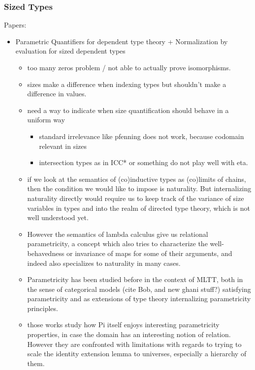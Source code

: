\documentclass{book}
\begin{document}
\subsubsection{Sized Types}
Papers:
\begin{itemize}
\item Parametric Quantifiers for dependent type theory + Normalization by evaluation for sized dependent types
    \begin{itemize}
    \item too many zeros problem / not able to actually prove isomorphisms.
    \item sizes make a difference when indexing types but shouldn't make a difference in values.
    \item need a way to indicate when size quantification should behave in a uniform way
      \begin{itemize}
      \item standard irrelevance like pfenning does not work, because codomain relevant in sizes
      \item intersection types as in ICC* or something do not play well with eta.
      \end{itemize}
      
    \item if we look at the semantics of (co)inductive types as (co)limits
    of chains, then the condition we would like to impose is
    naturality. But internalizing naturality directly would require us
    to keep track of the variance of size variables in types and into
    the realm of directed type theory, which is not well understood
    yet.
    
    \item However the semantics of lambda calculus give us relational
    parametricity, a concept which also tries to characterize the
    well-behavedness or invariance of maps for some of their
    arguments, and indeed also specializes to naturality in many cases.

    \item Parametricity has been studied before in the context of MLTT,
    both in the sense of categorical models (cite Bob, and new ghani
    stuff?) satisfying parametricity and as extensions of type theory
    internalizing parametricity principles.

    \item those works study how Pi itself enjoys interesting parametricity
    properties, in case the domain has an interesting notion of
    relation. However they are confronted with limitations with
    regards to trying to scale the identity extension lemma to
    universes, especially a hierarchy of them.


\end{itemize}
\end{itemize}
\end{document}
